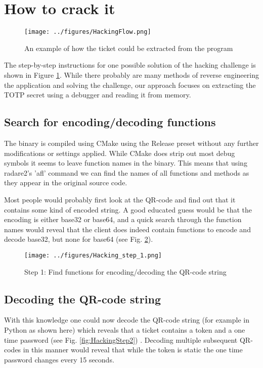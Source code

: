\section{How to crack it}
\begin{figure}[H]
    \centering
    \texttt{[image: ../figures/HackingFlow.png]}
    \caption{An example of how the ticket could be extracted from the program}
    \label{fig:HackingFlow}
\end{figure}

The step-by-step instructions for one possible solution of the hacking challenge is shown in Figure \ref{fig:HackingFlow}. While there probably are many methods of reverse engineering the application and solving the challenge, our approach focuses on extracting the TOTP secret using a debugger and reading it from memory.

\subsection{Search for encoding/decoding functions}
The binary is compiled using CMake using the Release preset without any further modifications or settings applied. While CMake does strip out most debug symbols it seems to leave function names in the binary. This means that using radare2's 'afl' command we can find the names of all functions and methods as they appear in the original source code.

Most people would probably first look at the QR-code and find out that it contains some kind of encoded string. A good educated guess would be that the encoding is either base32 or base64, and a quick search through the function names would reveal that the client does indeed contain functions to encode and decode base32, but none for base64 (see Fig. \ref{fig:HackingStep1}).

\begin{figure}[H]
    \centering
    \texttt{[image: ../figures/Hacking\_step\_1.png]}
    \caption{Step 1: Find functions for encoding/decoding the QR-code string}
    \label{fig:HackingStep1}
\end{figure}

\subsection{Decoding the QR-code string}

With this knowledge one could now decode the QR-code string (for example in Python as shown here) which reveals that a ticket contains a token and a one time password (see Fig. \ref{fig:HackingStep2}) . Decoding multiple subsequent QR-codes in this manner would reveal that while the token is static the one time password changes every 15 seconds.

